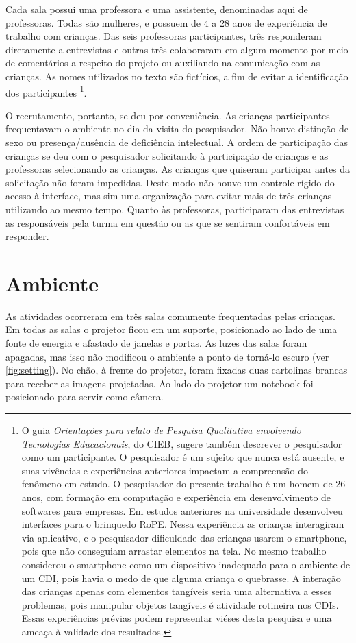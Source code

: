 Cada sala possui uma professora e uma assistente, denominadas aqui de professoras. Todas são mulheres, e possuem de 4 a 28 anos de experiência de trabalho com crianças. Das seis professoras participantes, três responderam diretamente a entrevistas e outras três colaboraram em algum momento por meio de comentários a respeito do projeto ou auxiliando na comunicação com as crianças. As nomes utilizados no texto são fictícios, a fim de evitar a identificação dos participantes
\footnote{
    O guia \textit{Orientações para relato de Pesquisa Qualitativa envolvendo Tecnologias Educacionais}, do \ac{CIEB}, sugere também descrever o pesquisador como um participante. O pesquisador é um sujeito que nunca está ausente, e suas vivências e experiências anteriores impactam a compreensão do fenômeno em estudo. O pesquisador do presente trabalho é um homem de 26 anos, com formação em computação e experiência em desenvolvimento de softwares para empresas. Em estudos anteriores na universidade desenvolveu interfaces para o brinquedo RoPE. Nessa experiência as crianças interagiram via aplicativo, e o pesquisador dificuldade das crianças usarem o smartphone, pois que não conseguiam arrastar elementos na tela. No mesmo trabalho considerou o smartphone como um dispositivo inadequado para o ambiente de um CDI, pois havia o medo de que alguma criança o quebrasse. A interação das crianças apenas com elementos tangíveis seria uma alternativa a esses problemas, pois manipular objetos tangíveis é atividade rotineira nos CDIs. Essas experiências prévias podem representar viéses desta pesquisa e uma ameaça à validade dos resultados.
}.

O recrutamento, portanto, se deu por conveniência. As crianças participantes frequentavam o ambiente no dia da visita do pesquisador. Não houve distinção de sexo ou presença/ausência de deficiência intelectual. A ordem de participação das crianças se deu com o pesquisador solicitando à participação de crianças e as professoras selecionando as crianças. As crianças que quiseram participar antes da solicitação não foram impedidas. Deste modo não houve um controle rígido do acesso à interface, mas sim uma organização para evitar mais de três crianças utilizando ao mesmo tempo. Quanto às professoras, participaram das entrevistas as responsáveis pela turma em questão ou as que se sentiram confortáveis em responder.

\section{Ambiente}
As atividades ocorreram em três salas comumente frequentadas pelas crianças. Em todas as salas o projetor ficou em um suporte, posicionado ao lado de uma fonte de energia e afastado de janelas e portas. As luzes das salas foram apagadas, mas isso não modificou o ambiente a ponto de torná-lo escuro (ver \autoref{fig:setting}). No chão, à frente do projetor, foram fixadas duas cartolinas brancas para receber as imagens projetadas. Ao lado do projetor um notebook foi posicionado para servir como câmera. 

